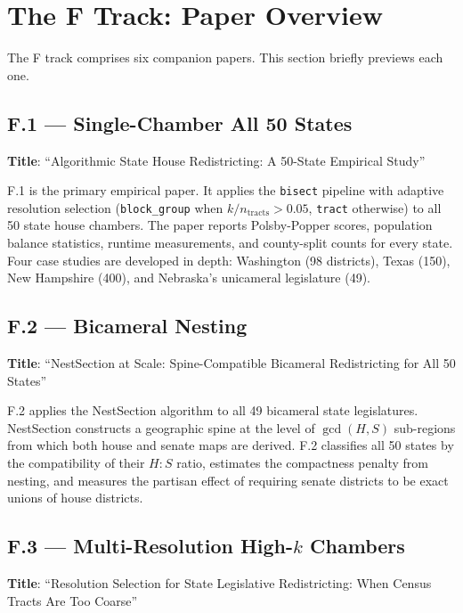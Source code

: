 \section{The F Track: Paper Overview}
\label{sec:overview}

The F track comprises six companion papers. This section briefly previews
each one.

\subsection{F.1 --- Single-Chamber All 50 States}
\label{sec:overview:f1}

\textbf{Title}: ``Algorithmic State House Redistricting: A 50-State Empirical Study''

F.1 is the primary empirical paper. It applies the \texttt{bisect} pipeline
with adaptive resolution selection (\texttt{block\_group} when
$k/n_{\mathrm{tracts}} > 0.05$, \texttt{tract} otherwise) to all 50 state
house chambers. The paper reports Polsby-Popper scores, population balance
statistics, runtime measurements, and county-split counts for every state.
Four case studies are developed in depth: Washington (98 districts),
Texas (150), New Hampshire (400), and Nebraska's unicameral legislature (49).

\subsection{F.2 --- Bicameral Nesting}
\label{sec:overview:f2}

\textbf{Title}: ``NestSection at Scale: Spine-Compatible Bicameral Redistricting for All 50 States''

F.2 applies the NestSection algorithm \citep{dellaLibera2026nestSection} to
all 49 bicameral state legislatures. NestSection constructs a geographic spine
at the level of $\gcd(H,S)$ sub-regions from which both house and senate maps
are derived. F.2 classifies all 50 states by the compatibility of their
$H:S$ ratio, estimates the compactness penalty from nesting, and measures
the partisan effect of requiring senate districts to be exact unions of
house districts.

\subsection{F.3 --- Multi-Resolution High-$k$ Chambers}
\label{sec:overview:f3}

\textbf{Title}: ``Resolution Selection for State Legislative Redistricting: When Census Tracts Are Too Coarse''

